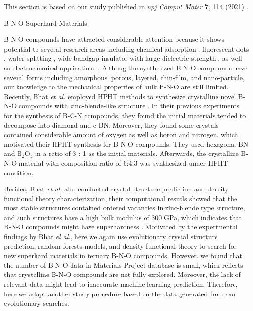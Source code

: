 	\vspace{12pt}
	
	\noindent This section is based on our study published in {\it npj Comput Mater} {\bf 7}, 114 (2021) \cite{chen2021machine}.





		

			
	
    
    \pagebreak
	{\centering
		\vspace{12pt} B-N-O Superhard Materials
	    \par
	}

B-N-O compounds have attracted considerable attention because it shows potential to several research areas including chemical adsorption \cite{shankar2021gas}, fluorescent dots \cite{ren2020boron}, water splitting \cite{xie2012boron}, wide bandgap insulator with large dielectric strength  \cite{arnold2021composition}, as well as electrochemical applications \cite{dussauze2013lithium}. Althoug the synthesized B-N-O compounds have several forms including amorphous, porous, layered, thin-film, and nano-particle, our knowledge to the mechanical properties of bulk B-N-O are still limited. Recently, Bhat {\it et al.} employed HPHT methods to synthesize crystalline novel B-N-O compounds with zinc-blende-like structure \cite{bhat2015high}. In their previous experiments for the synthesis of B-C-N compounds, they found the initial materials tended to decompose into diamond and c-BN. Moreover, they found some crystals contained considerable amount of oxygen as well as boron and nitrogen, which motivated their HPHT synthesis for B-N-O compounds. They used hexagonal BN and B$_2$O$_3$ in a ratio of 3 : 1 as the initial materials. Afterwards, the crystalline B-N-O material with composition ratio of 6:4:3 was synthesized under HPHT condition.

Besides, Bhat {\it et al.} also conducted crystal structure prediction and density functional theory characterization, their computaional resutls showed that the most stable structures contained ordered vacancies in zinc-blende type structure, and such structures have a high bulk modulus of 300 GPa, which indicates that B-N-O compounds might have superhardness \cite{bhat2015high}. Motivated by the experimental findings by Bhat {\it el al.}, here we again use evolutionary crystal structure prediction, random forests models, and density functional theory to search for new superhard materials in ternary B-N-O compounds. However, we found that the number of B-N-O data in Materials Project database is small, which reflects that crystalline B-N-O compounds are not fully explored. Moreover, the lack of relevant data might lead to inaccurate machine learning prediction. Therefore, here we adopt another study procedure based on the data generated from our evolutionary searches. 


